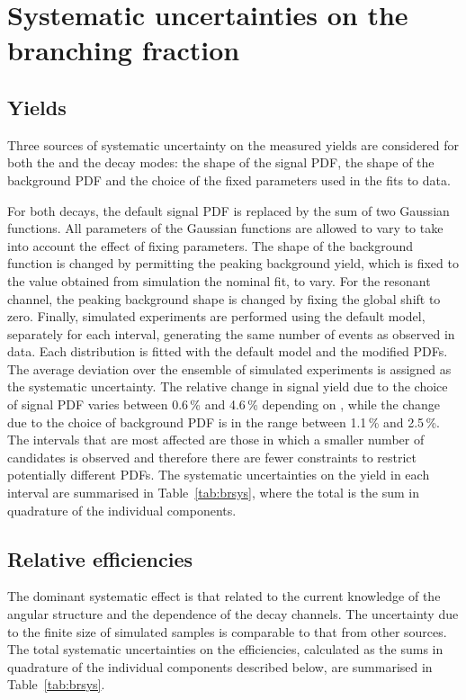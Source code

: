 \section{Systematic uncertainties on the branching fraction}
\label{sec:systemtics}
\subsection{Yields}
\label{sec:systematics_yields}
 Three sources of systematic uncertainty on the measured yields are
 considered for both the \decay{\Lb}{\jpsi\Lz} and the
 \decay{\Lb}{\Lz\mumu} decay modes: the shape of the signal PDF, the
 shape of the background PDF and the choice of the fixed parameters
 used in the fits to data.

 For both decays, the default signal PDF is replaced by the sum of two
 Gaussian functions. All parameters of the Gaussian functions are
 allowed to vary to take into account the effect of fixing
 parameters. The shape of the background function is changed by
 permitting the \KS\mumu peaking background yield, which is fixed to
 the value obtained from simulation the nominal fit, to vary.  For the
 resonant channel, the \jpsi\KS peaking background shape is changed by
 fixing the global shift to zero.  Finally, simulated experiments are
 performed using the default model, separately for each \qsq interval,
 generating the same number of events as observed in data.  Each
 distribution is fitted with the default model and the modified
 PDFs. The average deviation over the ensemble of simulated
 experiments is assigned as the systematic uncertainty.  The relative
 change in signal yield due to the choice of signal PDF varies between
 0.6\,\% and 4.6\,\% depending on \qsq, while the change due to the
 choice of background PDF is in the range between 1.1\,\% and
 2.5\,\%. The \qsq intervals that are most affected are those in which
 a smaller number of candidates is observed and therefore there are
 fewer constraints to restrict potentially different PDFs.  The
 systematic uncertainties on the yield in each \qsq interval are
 summarised in Table~\ref{tab:brsys}, where the total is the sum in
 quadrature of the individual components.

\subsection{Relative efficiencies}
 \label{sec:systematics_eff}
 The dominant systematic effect is that related to the current
 knowledge of the angular structure and the \qsq dependence of the
 decay channels.  The uncertainty due to the finite size of simulated
 samples is comparable to that from other sources. The total
 systematic uncertainties on the efficiencies, calculated as the sums
 in quadrature of the individual components described below,
 are summarised in Table~\ref{tab:brsys}.



